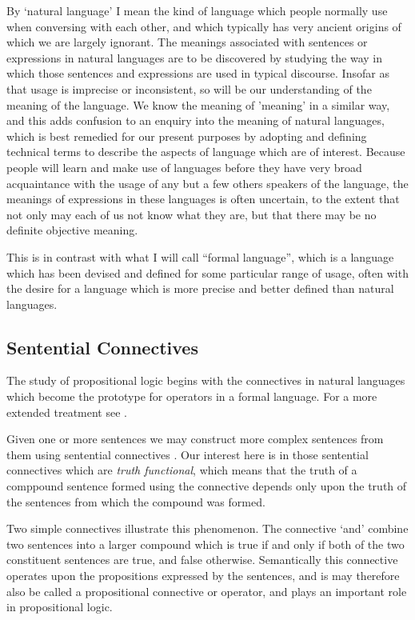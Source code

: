 \documentclass[10pt,titlepage]{article}
\begin{document}
By `natural language' I mean the kind of language which people normally use when conversing with each other, and which typically has very ancient origins of which we are largely ignorant.
The meanings associated with sentences or expressions in natural languages are to be discovered by studying the way in which those sentences and expressions are used in typical discourse.
Insofar as that usage is imprecise or inconsistent, so will be our understanding of the meaning of the language.
We know the meaning of 'meaning' in a similar way, and this adds confusion to an enquiry into the meaning of natural languages, which is best remedied for our present purposes by adopting and defining technical terms to describe the aspects of language which are of interest.
Because people will learn and make use of languages before they have very broad acquaintance with the usage of any but a few others speakers of the language, the meanings of expressions in these languages is often uncertain, to the extent that not only may each of us not know what they are, but that there may be no definite objective meaning.

This is in contrast with what I will call ``formal language'', which is a language which has been devised and defined for some particular range of usage, often with the desire for a language which is more precise and better defined than natural languages.

\subsection{Sentential Connectives}

The study of propositional logic begins with the connectives in natural languages which become the prototype for operators in a formal language.
For a more extended treatment see \cite{sep-connectives-logic}.

Given one or more sentences we may construct more complex sentences from them using sentential connectives .
Our interest here is in those sentential connectives which are \emph{truth functional}, which means that the truth of a comppound sentence formed using the connective depends only upon the truth of the sentences from which the compound was formed.

Two simple connectives illustrate this phenomenon.
The connective `and' combine two sentences into a larger compound which is true if and only if both of the two constituent sentences are true, and false otherwise.
Semantically this connective operates upon the propositions expressed by the sentences, and is may therefore also be called a propositional connective or operator, and plays an important role in propositional logic.
\end{document}
